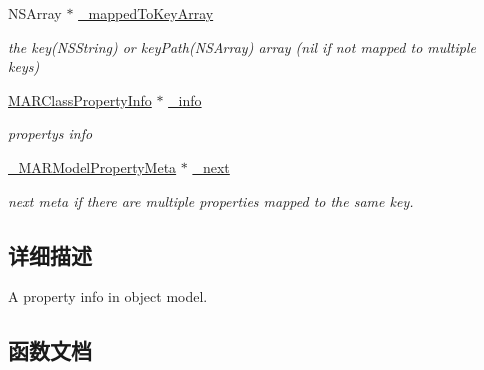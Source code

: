 \begin{DoxyCompactItemize}
N\+S\+Array $\ast$ \hyperlink{interface___m_a_r_model_property_meta_a97624816268863897c2798e557fbdfea}{\+\_\+mapped\+To\+Key\+Array}
\begin{DoxyCompactList}\small\item\em the key(\+N\+S\+String) or key\+Path(\+N\+S\+Array) array (nil if not mapped to multiple keys) \end{DoxyCompactList}\item 
\hyperlink{interface_m_a_r_class_property_info}{M\+A\+R\+Class\+Property\+Info} $\ast$ \hyperlink{interface___m_a_r_model_property_meta_ab82f5d142e3b18e65636e2f15121670f}{\+\_\+info}
\begin{DoxyCompactList}\small\item\em property\textquotesingle{}s info \end{DoxyCompactList}\item 
\hyperlink{interface___m_a_r_model_property_meta}{\+\_\+\+M\+A\+R\+Model\+Property\+Meta} $\ast$ \hyperlink{interface___m_a_r_model_property_meta_ac7be727b1813d53df7d7001a08a80eac}{\+\_\+next}
\begin{DoxyCompactList}\small\item\em next meta if there are multiple properties mapped to the same key. \end{DoxyCompactList}\end{DoxyCompactItemize}


\subsection{详细描述}
A property info in object model. 

\subsection{函数文档}
\mbox{\label{interface___m_a_r_model_property_meta_a90afde8b02198311971f9bbbea5c1f8a}} 
